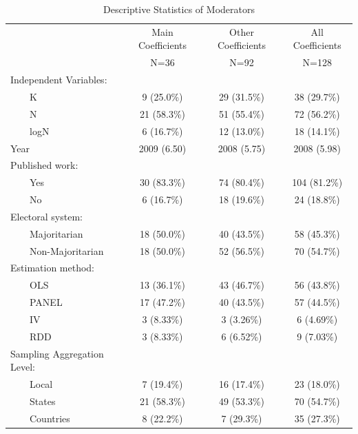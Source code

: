 \documentclass[a4paper,12pt]{article}
\begin{document}
\begin{table}[htpb]
 \caption{Descriptive Statistics of Moderators}
 \centering
 \begin{tabular}{lccc}
    \hline  \hline
    & Main Coefficients & Other Coefficients &   All Coefficients    \\ 
    &        N=36        &       N=92        &    N=128    \\ 
    \hline     
    Independent Variables: &             &                    &                  \\
$\qquad$K &    9 (25.0\%)      &     29 (31.5\%)    & 38 (29.7\%)  \\ 
$\qquad$N &      21 (58.3\%)     &    51 (55.4\%)   & 72 (56.2\%)  \\ 
$\qquad$logN &      6 (16.7\%)     &     12 (13.0\%)    & 18 (14.1\%)  \\ 
Year &     2009 (6.50)    &    2008 (5.75)   & 2008 (5.98) \\ 
Published work: &             &                    &                  \\ 
$\qquad$Yes &     30 (83.3\%)     &    74 (80.4\%)    & 104 (81.2\%) \\ 
$\qquad$No &    6 (16.7\%)       &     18 (19.6\%)   & 24 (18.8\%)  \\ 
Electoral system: &             &                    &                  \\ 
$\qquad$Majoritarian &     18 (50.0\%)      &    40 (43.5\%)   & 58 (45.3\%)  \\ 
$\qquad$Non-Majoritarian &    18 (50.0\%)       &    52 (56.5\%)   & 70 (54.7\%)  \\ 
Estimation method: &             &                    &                  \\ 
$\qquad$OLS &     13 (36.1\%)     &   43 (46.7\%)     & 56 (43.8\%)  \\ 
$\qquad$PANEL &     17 (47.2\%)     &    40 (43.5\%)    & 57 (44.5\%)  \\ 
$\qquad$IV &     3 (8.33\%)      &     3 (3.26\%)    &  6 (4.69\%)  \\ 
$\qquad$RDD &     3 (8.33\%)      &     6 (6.52\%)    &  9 (7.03\%)  \\ 
Sampling Aggregation Level: &             &                    &                  \\ 
$\qquad$Local &     7 (19.4\%)      &     16 (17.4\%)   & 23 (18.0\%)  \\ 
$\qquad$States &    21 (58.3\%)      &    49 (53.3\%)    & 70 (54.7\%)  \\ 
$\qquad$Countries &     8 (22.2\%)      &     7 (29.3\%)   & 35 (27.3\%)  \\ 
\hline  
\end{tabular}
\label{tab:descriptive}
\begin{minipage}{\textwidth}
\renewcommand{\footnoterule}{}
\end{minipage}    
\end{table} 
\end{document}
